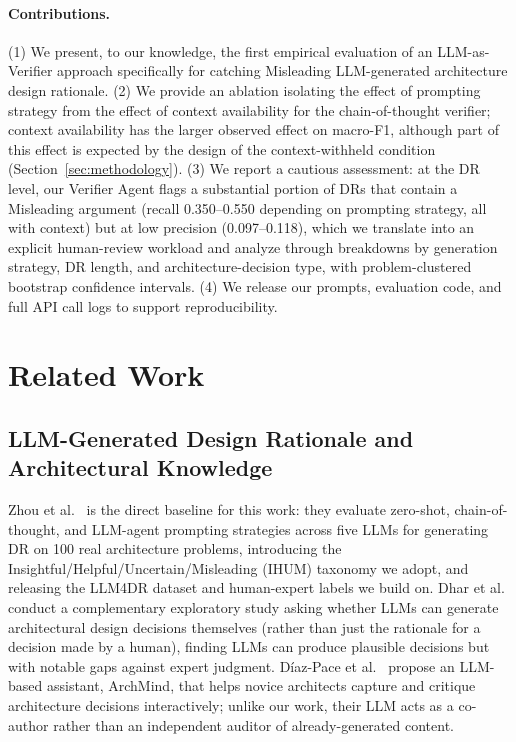 \documentclass[runningheads]{llncs}
\begin{document}
\paragraph{Contributions.} (1) We present, to our knowledge, the first empirical evaluation of an LLM-as-Verifier approach specifically for catching Misleading LLM-generated architecture design rationale. (2) We provide an ablation isolating the effect of prompting strategy from the effect of context availability for the chain-of-thought verifier; context availability has the larger observed effect on macro-F1, although part of this effect is expected by the design of the context-withheld condition (Section~\ref{sec:methodology}). (3) We report a cautious assessment: at the DR level, our Verifier Agent flags a substantial portion of DRs that contain a Misleading argument (recall 0.350--0.550 depending on prompting strategy, all with context) but at low precision (0.097--0.118), which we translate into an explicit human-review workload and analyze through breakdowns by generation strategy, DR length, and architecture-decision type, with problem-clustered bootstrap confidence intervals. (4) We release our prompts, evaluation code, and full API call logs to support reproducibility.


\section{Related Work}
\label{sec:relwork}

\subsection{LLM-Generated Design Rationale and Architectural Knowledge}
Zhou et al.\ \cite{zhou2025llm} is the direct baseline for this work: they evaluate zero-shot, chain-of-thought, and LLM-agent prompting strategies across five LLMs for generating DR on 100 real architecture problems, introducing the Insightful\allowbreak/Helpful\allowbreak/Uncertain\allowbreak/Misleading (IHUM) taxonomy we adopt, and releasing the LLM4DR dataset and human-expert labels we build on. Dhar et al.\ \cite{dhar2024llm} conduct a complementary exploratory study asking whether LLMs can generate architectural design decisions themselves (rather than just the rationale for a decision made by a human), finding LLMs can produce plausible decisions but with notable gaps against expert judgment. D\'{i}az-Pace et al.\ \cite{diazpace2024archmind} propose an LLM-based assistant, ArchMind, that helps novice architects capture and critique architecture decisions interactively; unlike our work, their LLM acts as a co-author rather than an independent auditor of already-generated content.
\end{document}
